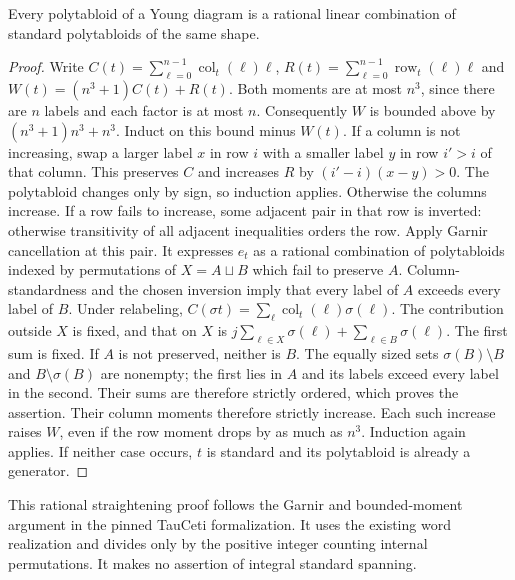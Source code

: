 \begin{theorem}
\label{lem:rational-standard-spanning}
\leanok
Every polytabloid of a Young diagram is a rational linear combination
of standard polytabloids of the same shape.
\end{theorem}
\begin{proof}
Write $C(t)=\sum_{\ell=0}^{n-1}\operatorname{col}_t(\ell)\ell$,
$R(t)=\sum_{\ell=0}^{n-1}\operatorname{row}_t(\ell)\ell$
and $W(t)=(n^3+1)C(t)+R(t)$. Both moments are at most $n^3$,
since there are $n$ labels and each factor is at most $n$.
Consequently $W$ is bounded above by $(n^3+1)n^3+n^3$.
Induct on this bound minus $W(t)$.
If a column is not increasing, swap a larger label $x$ in row
$i$ with a smaller label $y$ in row $i'>i$ of that column.
This preserves $C$ and increases $R$ by $(i'-i)(x-y)>0$.
The polytabloid changes only by sign, so induction applies.
Otherwise the columns increase. If a row fails to increase, some
adjacent pair in that row is inverted: otherwise transitivity of
all adjacent inequalities orders the row. Apply Garnir cancellation
at this pair. It expresses $e_t$ as a rational combination of
polytabloids indexed by permutations of $X=A\sqcup B$ which fail
to preserve $A$. Column-standardness and the chosen inversion
imply that every label of $A$ exceeds every label of $B$.
Under relabeling, $C(\sigma t)=\sum_\ell
\operatorname{col}_t(\ell)\sigma(\ell)$. The contribution outside
$X$ is fixed, and that on $X$ is
$j\sum_{\ell\in X}\sigma(\ell)+\sum_{\ell\in B}\sigma(\ell)$.
The first sum is fixed. If $A$ is not preserved, neither is $B$.
The equally sized sets $\sigma(B)\setminus B$ and
$B\setminus\sigma(B)$ are nonempty; the first lies in $A$ and
its labels exceed every label in the second. Their sums are
therefore strictly ordered, which proves the assertion.
Their column moments therefore strictly increase. Each such
increase raises $W$, even if the row moment drops by as much as
$n^3$. Induction again applies. If neither case occurs, $t$ is
standard and its polytabloid is already a generator.
\end{proof}

\begin{remark}
This rational straightening proof follows the Garnir and bounded-moment
argument in the pinned TauCeti formalization. It uses the existing word
realization and divides only by the positive integer counting internal
permutations. It makes no assertion of integral standard spanning.
\end{remark}

